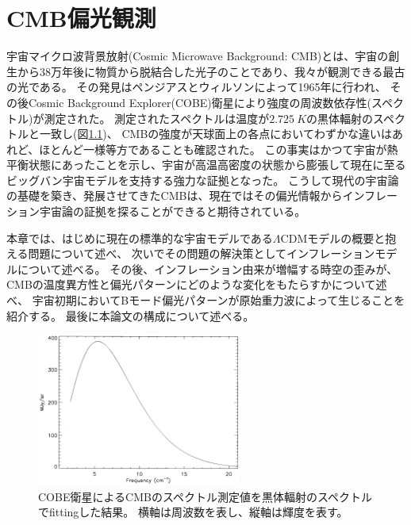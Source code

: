 \documentclass[../../main.tex]{subfiles}
\begin{document}
\chapter{CMB偏光観測}
宇宙マイクロ波背景放射(Cosmic Microwave Background: CMB)とは、宇宙の創生から38万年後に物質から脱結合した光子のことであり、我々が観測できる最古の光である。
その発見はペンジアスとウィルソンによって1965年に行われ\cite{1965ApJ...142..419P}、
その後Cosmic Background Explorer(COBE)衛星により強度の周波数依存性(スペクトル)が測定された\cite{1996ApJ...473..576F}。
測定されたスペクトルは温度が$\SI{2.725}{K}$の黒体輻射のスペクトルと一致し(図\ref{fig:cobe})、
CMBの強度が天球面上の各点においてわずかな違いはあれど、ほとんど一様等方であることも確認された。
この事実はかつて宇宙が熱平衡状態にあったことを示し、宇宙が高温高密度の状態から膨張して現在に至るビッグバン宇宙モデルを支持する強力な証拠となった。
こうして現代の宇宙論の基礎を築き、発展させてきたCMBは、現在ではその偏光情報からインフレーション宇宙論の証拠を探ることができると期待されている。

本章では、はじめに現在の標準的な宇宙モデルである$\Lambda\mathrm{CDM}$モデルの概要と抱える問題について述べ、
次いでその問題の解決策としてインフレーションモデルについて述べる。
その後、インフレーション由来が増幅する時空の歪みが、
CMBの温度異方性と偏光パターンにどのような変化をもたらすかについて述べ、
宇宙初期においてBモード偏光パターンが原始重力波によって生じることを紹介する。
最後に本論文の構成について述べる。
\begin{figure}[H]
    \centering
    \includegraphics[width=0.6\textwidth]{intro/cobe.pdf}
    \caption{COBE衛星によるCMBのスペクトル測定値を黒体輻射のスペクトルでfittingした結果。
    横軸は周波数を表し、縦軸は輝度を表す。}
    \label{fig:cobe}
\end{figure}
\end{document}
